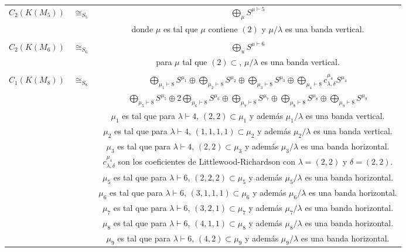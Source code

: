 \documentclass[12pt]{book}
\theoremstyle{definition}
\newcounter{in}
\begin{document}
\begin{center}
\begin{table}[H]
{\begin{turn}{0}
\begin{tabular}{| c | c | c |}
& & \\ \hline
$C_{2}(K(M_{5}))$ &$\cong_{S_{5}}$&  $\bigoplus_{\mu} S^{\mu \vdash 5}$ \\ \hline
& & donde $\mu$ es tal que $\mu$ contiene $(2)$ y $\mu / \lambda$ es una banda vertical.  \\ \hline
& & \\ \hline
$C_{2}(K(M_{6}))$ & $\cong_{S_{6}}$ &  $\bigoplus_{u} S^{\mu \vdash 6}$ \\ \hline
& & para $\mu$ tal que $(2) \subset $, $\mu / \lambda$ es una banda vertical.  \\ \hline
& & \\ \hline
$C_{1}(K(M_{8}))$ & $\cong_{S_{8}}$ &  $\bigoplus_{\mu_{1} \vdash 8} S^{\mu_{1}} \oplus \bigoplus_{\mu_{2}\vdash 8} S^{\mu_{2}} \oplus \bigoplus_{\mu_{3}\vdash 8} S^{\mu_{3}} \oplus \bigoplus_{\mu_{4} \vdash 8} c_{\lambda,\delta}^{\mu_{4}}S^{\mu_{4}}$  \\ \hline
 &  &  $\bigoplus_{\mu_{5}\vdash 8} S^{\mu_{5}} \oplus 2\bigoplus_{\mu_{6}\vdash 8} S^{\mu_{6}} \oplus \bigoplus_{\mu_{7}\vdash 8} S^{\mu_{7}} \oplus \bigoplus_{\mu_{8}\vdash 8} S^{\mu_{8}} \oplus \bigoplus_{\mu_{9}\vdash 8} S^{\mu_{9}}$  \\ \hline
 & &  $\mu_{1}$ es tal que para $\lambda \vdash 4$, $(2,2) \subset \mu_{1}$ y además $\mu_{1} / \lambda$ es una banda vertical. \\ \hline
 & & $\mu_{2}$ es tal que para $\lambda \vdash 4$, $(1,1,1,1) \subset \mu_{2}$ y además $\mu_{2} / \lambda$ es una banda vertical.  \\ \hline
 & &  $\mu_{3}$ es tal que para $\lambda \vdash 4$, $(2,2) \subset \mu_{3}$ y además $\mu_{3} / \lambda$ es una banda horizontal. \\ \hline
  & & $c_{\lambda,\delta}^{\mu_{4}}$ son los coeficientes de Littlewood-Richardson con $\lambda = (2,2)$ y $\delta = (2,2)$.\\ \hline
   & &  $\mu_{5}$ es tal que para $\lambda \vdash 6$, $(2,2,2) \subset \mu_{5}$ y además $\mu_{5} / \lambda$ es una banda horizontal. \\ \hline
    & &  $\mu_{6}$ es tal que para $\lambda \vdash 6$, $(3,1,1,1) \subset \mu_{6}$ y además $\mu_{6} / \lambda$ es una banda horizontal. \\ \hline
     & &  $\mu_{7}$ es tal que para $\lambda \vdash 6$, $(3,2,1) \subset \mu_{7}$ y además $\mu_{7} / \lambda$ es una banda horizontal. \\ \hline
     & &   $\mu_{8}$ es tal que para $\lambda \vdash 6$, $(4,1,1) \subset \mu_{8}$ y además $\mu_{8} / \lambda$ es una banda horizontal. \\ \hline
     & &  $\mu_{9}$ es tal que para $\lambda \vdash 6$, $(4,2) \subset \mu_{9}$ y además $\mu_{9} / \lambda$ es una banda horizontal. \\ \hline
\end{tabular}
\end{turn}
}
\end{table}
\end{center}
\end{document}

